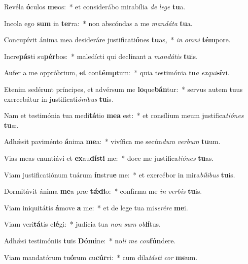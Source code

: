\item Revéla \textbf{ó}culos \textbf{me}os:~* et considerábo mirabília \textit{de} \textit{le}\textit{ge} \textbf{tu}a.
\item Incola ego \textbf{sum} in \textbf{ter}ra:~* non abscóndas a me \textit{man}\textit{dá}\textit{ta} \textbf{tu}a.
\item Concupívit ánima mea desideráre justificati\textbf{ó}nes \textbf{tu}as,~* \textit{in} \textit{om}\textit{ni} \textbf{tém}pore.
\item Incre\textbf{pás}ti su\textbf{pér}bos:~* maledícti qui declínant a \textit{man}\textit{dá}\textit{tis} \textbf{tu}is.
\item Aufer a me oppróbrium, \textbf{et} con\textbf{témp}tum:~* quia testimónia tu\textit{a} \textit{ex}\textit{qui}\textbf{sí}vi.
\item Etenim sedérunt príncipes, et advérsum me \textbf{lo}que\textbf{bán}tur:~* servus autem tuus exercebátur in justificati\textit{ó}\textit{ni}\textit{bus} \textbf{tu}is.
\item Nam et testimónia tua medi\textbf{tá}tio \textbf{me}\textbf{a} est:~* et consílium meum justifica\textit{ti}\textit{ó}\textit{nes} \textbf{tu}æ.
\item Adhǽsit paviménto \textbf{á}nima \textbf{me}a:~* vivífica me secún\textit{dum} \textit{ver}\textit{bum} \textbf{tu}um.
\item Vias meas enuntiávi et \textbf{ex}au\textbf{dís}\textbf{ti} me:~* doce me justifica\textit{ti}\textit{ó}\textit{nes} \textbf{tu}as.
\item Viam justificatiónum tuárum \textbf{ín}stru\textbf{e} me:~* et exercébor in mira\textit{bí}\textit{li}\textit{bus} \textbf{tu}is.
\item Dormitávit ánima \textbf{me}a præ \textbf{tǽ}\textbf{di}o:~* confírma me \textit{in} \textit{ver}\textit{bis} \textbf{tu}is.
\item Viam iniquitátis \textbf{á}move \textbf{a} me:~* et de lege tua mi\textit{se}\textit{ré}\textit{re} \textbf{me}i.
\item Viam veri\textbf{tá}tis e\textbf{lé}gi:~* judícia tua \textit{non} \textit{sum} \textit{ob}\textbf{lí}tus.
\item Adhǽsi testimóniis \textbf{tu}is \textbf{Dó}\textbf{mi}ne:~* no\textit{li} \textit{me} \textit{con}\textbf{fún}dere.
\item Viam mandatórum tu\textbf{ó}rum cu\textbf{cúr}ri:~* cum dila\textit{tás}\textit{ti} \textit{cor} \textbf{me}um.
